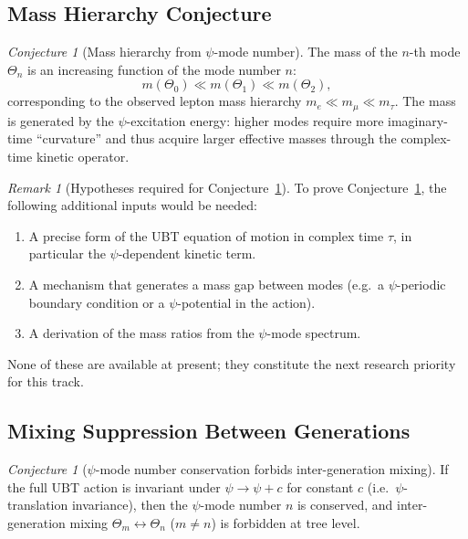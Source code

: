 \documentclass[12pt,a4paper]{article}
\theoremstyle{remark}
\newtheorem{remark}[theorem]{Remark}
\newtheorem{conjecture}[theorem]{Conjecture}
\begin{document}
\subsection{Mass Hierarchy Conjecture}

\begin{conjecture}[Mass hierarchy from $\psi$-mode number]
  \label{conj:mass_hierarchy}
  The mass of the $n$-th mode $\Theta_n$ is an increasing function of the
  mode number $n$:
  \[
    m(\Theta_0) \ll m(\Theta_1) \ll m(\Theta_2),
  \]
  corresponding to the observed lepton mass hierarchy $m_e \ll m_\mu \ll m_\tau$.
  The mass is generated by the $\psi$-excitation energy:
  higher modes require more imaginary-time ``curvature'' and thus acquire
  larger effective masses through the complex-time kinetic operator.
\end{conjecture}

\begin{remark}[Hypotheses required for Conjecture~\ref{conj:mass_hierarchy}]
  To prove Conjecture~\ref{conj:mass_hierarchy}, the following additional
  inputs would be needed:
  \begin{enumerate}[label=(\arabic*)]
    \item A precise form of the UBT equation of motion in complex time
      $\tau$, in particular the $\psi$-dependent kinetic term.
    \item A mechanism that generates a mass gap between modes (e.g.\ a
      $\psi$-periodic boundary condition or a $\psi$-potential in the action).
    \item A derivation of the mass ratios from the $\psi$-mode spectrum.
  \end{enumerate}
  None of these are available at present; they constitute the next research
  priority for this track.
\end{remark}

\subsection{Mixing Suppression Between Generations}

\begin{conjecture}[$\psi$-mode number conservation forbids inter-generation mixing]
  \label{conj:no_mixing}
  If the full UBT action is invariant under $\psi \to \psi + c$ for constant
  $c$ (i.e.\ $\psi$-translation invariance), then the $\psi$-mode number $n$
  is conserved, and inter-generation mixing
  $\Theta_m \leftrightarrow \Theta_n$ ($m \neq n$) is forbidden at tree level.
\end{conjecture}
\end{document}
